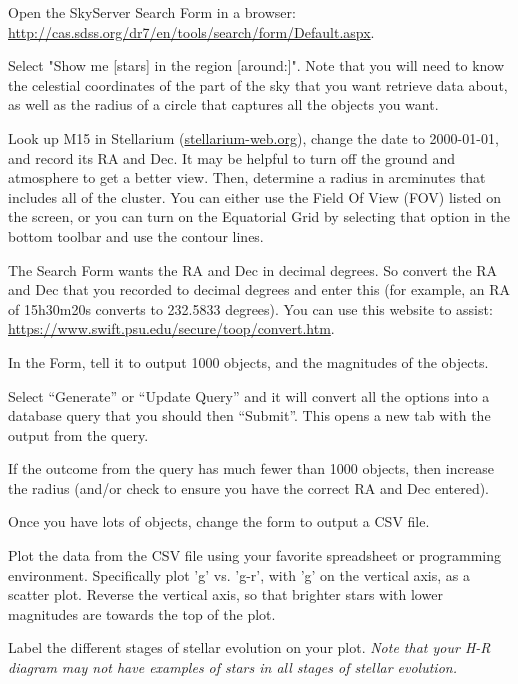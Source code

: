 \begin{steps}
	\item Open the SkyServer Search Form in a browser: \url{http://cas.sdss.org/dr7/en/tools/search/form/Default.aspx}.
	
	\item Select "Show me [stars] in the region [around:]". Note that you will need to know the celestial coordinates of the part of the sky that you want retrieve data about, as well as the radius of a circle that captures all the objects you want.
	
	\item Look up M15 in Stellarium (\url{stellarium-web.org}), change the date to 2000-01-01, and record its RA and Dec. It may be helpful to turn off the ground and atmosphere to get a better view. Then, determine a radius in arcminutes that includes all of the cluster. You can either use the Field Of View (FOV) listed on the screen, or you can turn on the Equatorial Grid by selecting that option in the bottom toolbar and use the contour lines.
	
	\item The Search Form wants the RA and Dec in decimal degrees. So convert the RA and Dec that you recorded to decimal degrees and enter this (for example, an RA of 15h30m20s converts to 232.5833 degrees). You can use this website to assist: \url{https://www.swift.psu.edu/secure/toop/convert.htm}.
	
	\item In the Form, tell it to output 1000 objects, and the magnitudes of the objects.
	
	\item Select ``Generate'' or ``Update Query'' and it will convert all the options into a database query that you should then ``Submit''. This opens a new tab with the output from the query.
	
	\item If the outcome from the query has much fewer than 1000 objects, then increase the radius (and/or check to ensure you have the correct RA and Dec entered).
	
	\item Once you have lots of objects, change the form to output a CSV file.
	
	\item Plot the data from the CSV file using your favorite spreadsheet or programming environment. Specifically plot 'g' vs. 'g-r', with 'g' on the vertical axis, as a scatter plot. Reverse the vertical axis, so that brighter stars with lower magnitudes are towards the top of the plot.

	\item Label the different stages of stellar evolution on your plot. \textit{Note that your H-R diagram may not have examples of stars in all stages of stellar evolution.}
\end{steps}

